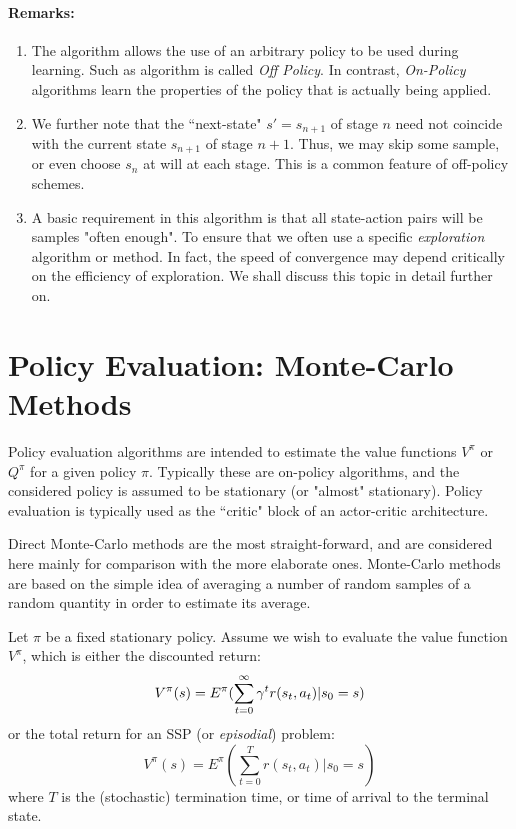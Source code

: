 \paragraph{Remarks:}
\begin{enumerate}
  \item The algorithm allows the use of an arbitrary policy to be used during learning.
Such as algorithm is called {\em Off Policy}. In contrast, {\em On-Policy}
algorithms learn the properties of the policy that is actually being applied.
  \item We further note that the ``next-state" $s'=s_{n+1}$ of stage $n$ need not
coincide with the current state $s_{n+1}$ of stage $n+1$. Thus, we may skip
some sample, or even choose $s_n$ at will at each stage. This is a common
feature of off-policy schemes.
  \item A basic requirement in this algorithm is that all state-action pairs will
be samples "often enough". To ensure that we often use a specific
{\em exploration} algorithm or method. In fact, the speed of convergence
may depend critically on the efficiency of exploration. We shall discuss this
topic in detail further on.
\end{enumerate}

\section{Policy Evaluation: Monte-Carlo Methods}

Policy evaluation algorithms are intended to estimate the value functions
$V^\pi$ or $Q^\pi$ for a given policy $\pi$. Typically these are on-policy
algorithms, and the considered policy is assumed to be stationary (or "almost"
stationary). Policy evaluation is typically used as the ``critic" block of an
actor-critic architecture.

Direct Monte-Carlo methods are the most straight-forward, and are considered
here mainly for comparison with the more elaborate ones. Monte-Carlo methods
are based on the simple idea of averaging a number of random samples of a
random quantity in order to estimate its average.

Let $\pi$ be a fixed stationary policy. Assume we wish to evaluate the
value function $V^\pi$, which is either the discounted return:
$$
V^\pi(s) = E^\pi (\sum_{t=0}^\infty \gamma^t r (s_t, a_t) | s_0=s)
$$
or the total return for an SSP (or {\em episodial}) problem:
$$
V^\pi(s) = E^\pi (\sum_{t=0}^T r(s_t, a_t)| s_0=s )
$$
where $T$ is the (stochastic) termination time, or time of arrival to
the terminal state.


